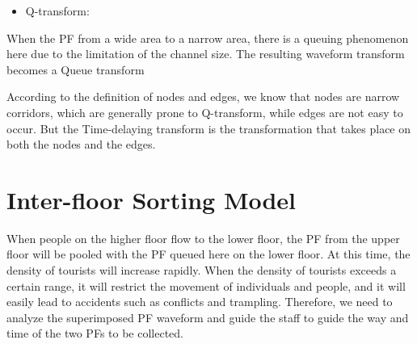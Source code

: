 
\begin{itemize}
    \item Q-transform:
\end{itemize}
When the PF from a wide area to a narrow area, there is a queuing phenomenon here due to the limitation of the channel size. The resulting waveform transform becomes a Queue transform

According to the definition of nodes and edges, we know that nodes are narrow corridors, which are generally prone to Q-transform, while edges are not easy to occur. But the Time-delaying transform is the transformation that takes place on both the nodes and the edges.



\section{Inter-floor Sorting Model}
When people on the higher floor flow to the lower floor, the PF from the upper floor will be pooled with the PF queued here on the lower floor. At this time, the density of tourists will increase rapidly. When the density of tourists exceeds a certain range, it will restrict the movement of individuals and people, and it will easily lead to accidents such as conflicts and trampling. Therefore, we need to analyze the superimposed PF waveform and guide the staff to guide the way and time of the two PFs to be collected.

